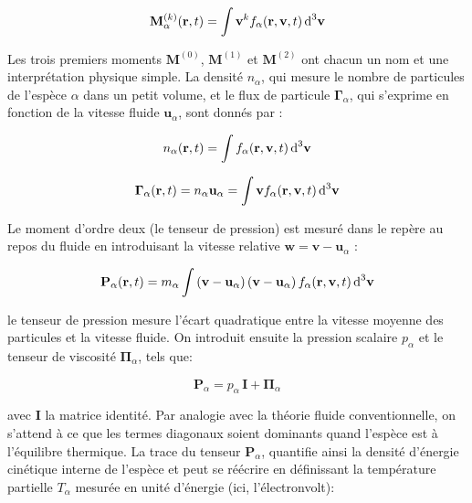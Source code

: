 \begin{refsection}
\begin{equation}
\mathbf M^{(k)}_\alpha(\mathbf
r,t)=\int\mathbf{v}^k f_\alpha(\mathbf r,\mathbf v,t)
\,\text{d}^{{3}}\mathbf{v}
\end{equation}

Les trois premiers moments $\mathbf M^{(0)}$, $\mathbf M^{(1)}$ et $\mathbf
M^{(2)}$ ont chacun un nom et une interprétation physique simple. La densité
$n_\alpha$, qui mesure le nombre de particules de l'espèce $\alpha$ dans un
petit volume, et le flux de particule $\boldsymbol{\Gamma}_\alpha$, qui
s'exprime en fonction de la vitesse fluide $\mathbf u_\alpha$, sont
donnés par :

\begin{equation}
n_\alpha(\mathbf
r,t)=\int f_\alpha(\mathbf r,\mathbf v,t)
\,\text{d}^{{3}}\mathbf{v}
\end{equation}

\begin{equation}
\boldsymbol{\Gamma}_\alpha(\mathbf
r,t)=n_\alpha\mathbf u_\alpha=\int \mathbf v f_\alpha(\mathbf r,\mathbf
v,t) \,\text{d}^{{3}}\mathbf{v}
\end{equation}

Le moment d'ordre deux (le tenseur de pression) est mesuré dans le repère au
repos du fluide en introduisant la vitesse relative $\mathbf w=\mathbf
v-\mathbf u_\alpha$ : 

\begin{equation}
\mathbf P_\alpha(\mathbf
r,t)=m_\alpha\int \left(\mathbf
v-\mathbf u_\alpha\right)\left(\mathbf
v-\mathbf u_\alpha\right)
f_\alpha(\mathbf r,\mathbf v,t) \,\text{d}^{{3}}\mathbf{v}
\end{equation}

le tenseur de pression mesure l'écart quadratique entre la vitesse moyenne des
particules et la vitesse fluide. On introduit ensuite la
pression scalaire $p_\alpha$ et le tenseur de viscosité
$\boldsymbol{\Pi}_\alpha$, tels que:

\begin{equation}
\label{1-tenseurPression}
\mathbf P_\alpha=p_\alpha\,\mathbf I + \boldsymbol{\Pi}_\alpha
\end{equation}

avec $\mathbf I$ la matrice identité. Par analogie avec la théorie fluide
conventionnelle, on s'attend à ce que les termes diagonaux soient dominants
quand l'espèce est à l'équilibre thermique. La trace du tenseur
$\mathbf P_\alpha$, quantifie ainsi la densité d'énergie cinétique
interne de l'espèce et peut se réécrire en définissant la température partielle 
$T_\alpha$ mesurée en unité d'énergie (ici, l'électronvolt):


\end{refsection}
